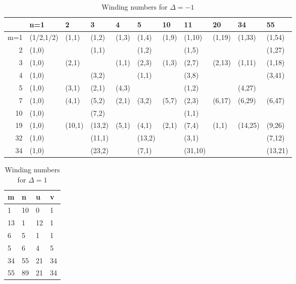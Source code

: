 \documentclass[a4paper]{article}
\begin{document}
\begin{table}[ht]
\centering
\begin{tabular}{rllllllllll}
  \hline
 & n=1 & 2 & 3 & 4 & 5 & 10 & 11 & 20 & 34 & 55 \\ 
  \hline
m=1 & (1/2,1/2) & (1,1) & (1,2) & (1,3) & (1,4) & (1,9) & (1,10) & (1,19) & (1,33) & (1,54) \\ 
  2 & (1,0) &  & (1,1) &  & (1,2) &  & (1,5) &  &  & (1,27) \\ 
  3 & (1,0) & (2,1) &  & (1,1) & (2,3) & (1,3) & (2,7) & (2,13) & (1,11) & (1,18) \\ 
  4 & (1,0) &  & (3,2) &  & (1,1) &  & (3,8) &  &  & (3,41) \\ 
  5 & (1,0) & (3,1) & (2,1) & (4,3) &  &  & (1,2) &  & (4,27) &  \\ 
  7 & (1,0) & (4,1) & (5,2) & (2,1) & (3,2) & (5,7) & (2,3) & (6,17) & (6,29) & (6,47) \\ 
  10 & (1,0) &  & (7,2) &  &  &  & (1,1) &  &  &  \\ 
  19 & (1,0) & (10,1) & (13,2) & (5,1) & (4,1) & (2,1) & (7,4) & (1,1) & (14,25) & (9,26) \\ 
  32 & (1,0) &  & (11,1) &  & (13,2) &  & (3,1) &  &  & (7,12) \\ 
  34 & (1,0) &  & (23,2) &  & (7,1) &  & (31,10) &  &  & (13,21) \\ 
   \hline
\end{tabular}
\caption{Winding numbers for $\Delta=-1$} 
\label{tab:wnm}
\end{table}
\begin{table}[ht]
\centering
\begin{tabular}{ll|ll}
  \hline
m & n & u & v \\ 
  \hline
1 & 10 & 0 & 1 \\ 
  13 & 1 & 12 & 1 \\ 
  6 & 5 & 1 & 1 \\ 
  5 & 6 & 4 & 5 \\ 
  34 & 55 & 21 & 34 \\ 
  55 & 89 & 21 & 34 \\ 
   \hline
\end{tabular}
\caption{Winding numbers for $\Delta=1$} 
\label{tab:wnp2}
\end{table}

\clearpage
\end{document}

